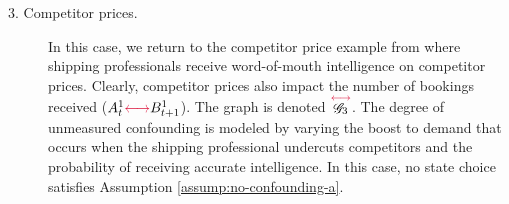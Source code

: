 \documentclass[12pt,a4paper]{article}
\theoremstyle{definition}
\DeclareMathOperator{\gG}{\mathscr{G}}
\begin{document}
\begin{description}
  \item[3. Competitor prices.] In this case, we return to the
    competitor price example from  where
    shipping professionals receive word-of-mouth intelligence on competitor
    prices. Clearly, competitor prices also impact the number of
    bookings received ($A^1_t
    \textcolor{graphRed}{\longleftrightarrow} B^1_{t+1}$). The graph
    is denoted
    $\overset{\textcolor{graphRed}{\longleftrightarrow}}{\gG_3}$. The
    degree of unmeasured confounding is modeled by varying the boost
    to demand that occurs when the shipping professional undercuts
    competitors and the probability of receiving accurate
    intelligence. In this case, no state choice satisfies Assumption
    \ref{assump:no-confounding-a}.
  \end{description}
\end{document}
